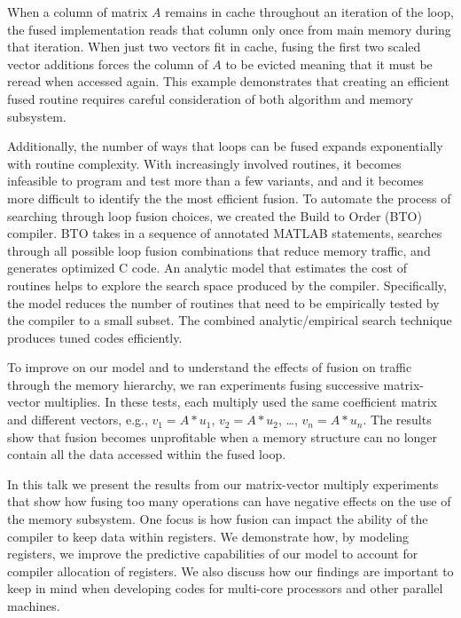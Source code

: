 \documentclass{report}
\begin{document}
\medskip
\noindent When a column of matrix $A$ remains in cache throughout an
iteration of the loop, the fused implementation reads that column only
once from main memory during that iteration. When just two vectors fit
in cache, fusing the first two scaled vector additions forces the column
of $A$ to be evicted meaning that it must be reread when accessed again.
This example demonstrates that creating an
efficient fused routine requires careful consideration of both algorithm
and memory subsystem.

Additionally, the number of ways that loops can be fused expands
exponentially with routine complexity. With increasingly involved
routines, it becomes infeasible to program and test more than a
few variants, and and it becomes more difficult to identify the the most
efficient fusion. To automate the process of searching through loop fusion choices, we
created the Build to Order (BTO) compiler. BTO takes in a sequence of
annotated MATLAB statements, searches through all possible loop fusion
combinations that reduce memory traffic, and generates optimized C code.
An analytic model that estimates the cost of routines helps to explore
the search space produced by the compiler. Specifically, the model
reduces the number of routines that need to be empirically tested by
the compiler to a small subset. The combined analytic/empirical search
technique produces tuned codes efficiently.

To improve on our model and to understand the effects of fusion on
traffic through the memory hierarchy, we ran experiments fusing successive
matrix-vector multiplies. In these tests, each multiply used the same
coefficient matrix and different vectors,
e.g., $v_1 = A * u_1$,
$v_2 = A * u_2$, \ldots , $v_n = A * u_n$. The results show that fusion becomes
unprofitable when a memory structure can no longer contain all the data
accessed within the fused loop.

In this talk we present the results from our matrix-vector multiply experiments
that show how fusing too many operations can have negative effects on
the use of the memory subsystem. One focus is how fusion can impact the
ability of the compiler to keep data within registers. We demonstrate
how, by modeling registers, we improve the predictive capabilities of
our model to account for compiler allocation of registers. We also
discuss how our findings are important to keep in mind when developing codes for
multi-core processors and other parallel machines.
\end{document}
